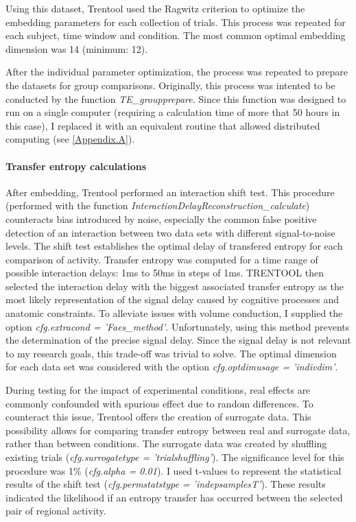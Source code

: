 Using this dataset, Trentool used the Ragwitz criterion to optimize the embedding parameters for each collection of trials.
This process was repeated for each subject, time window and condition.
The most common optimal embedding dimension was 14 (minimum: 12).

After the individual parameter optimization, the process was repeated to prepare the datasets for group comparisons.
Originally, this process was intented to be conducted by the function \emph{TE_groupprepare}.
Since this function was designed to run on a single computer (requiring a calculation time of more that 50 hours in this case), I replaced it with an equivalent routine that allowed distributed computing (see \ref{Appendix.A}).

\paragraph{Transfer entropy calculations}

After embedding, Trentool performed an interaction shift test.
This procedure (performed with the function \emph{InteractionDelayReconstruction\_calculate}) counteracts bias introduced by noise, especially the common false positive detection of an interaction between two data sets with different signal-to-noise levels.
The shift test establishes the optimal delay of transfered entropy for each comparison of activity.
Transfer entropy was computed for a time range of possible interaction delays: 1ms to 50ms in steps of 1ms.
TRENTOOL then selected the interaction delay with the biggest associated transfer entropy as the most likely representation of the signal delay caused by cognitive processes and anatomic constraints.
To alleviate issues with volume conduction, I supplied the option \emph{cfg.extracond = 'Faes\_method'}.
Unfortunately, using this method prevents the determination of the precise signal delay.
Since the signal delay is not relevant to my research goals, this trade-off was trivial to solve.
The optimal dimension for each data set was considered with the option \emph{cfg.optdimusage = 'indivdim'}.

During testing for the impact of experimental conditions, real effects are commonly confounded with spurious effect due to random differences.
To counteract this issue, Trentool offers the creation of surrogate data.
This possibility allows for comparing transfer entropy between real and surrogate data, rather than between conditions.
The surrogate data was created by shuffling existing trials (\emph{cfg.surrogatetype = 'trialshuffling'}).
The significance level for this procedure was 1\% (\emph{cfg.alpha = 0.01}).
I used t-values to represent the statistical results of the shift test (\emph{cfg.permstatstype = 'indepsamplesT'}).
These results indicated the likelihood if an entropy transfer has occurred between the selected pair of regional activity.

